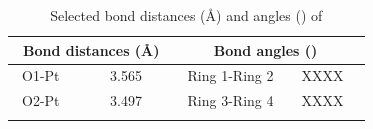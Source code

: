 \begin{table}[htp]
\caption[Selected bond distances (\AA) and angles (\degrees) of ]{Selected bond distances (\AA) and angles (\degrees) of }
\vspace{1em}
\label{crystal:rhodium:lengths:oxo}
\small
\begin{center}
\begin{tabular}{l l l l}
	\toprule
	\multicolumn{2}{l}{\bfseries{~Bond distances (\si{\angstrom})}} & \multicolumn{2}{c}{\bfseries{Bond angles (\degrees)}} \\
	\midrule		
	~O1-Pt		~~&~~3.565~~	&~~Ring 1-Ring 2		&~~XXXX~~		\\
	~O2-Pt		~~&~~3.497~~	&~~Ring 3-Ring 4		&~~XXXX~~		\\
	\bottomrule{}
\end{tabular}
\end{center}
\end{table}

